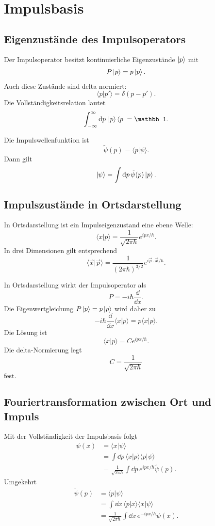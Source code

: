 \section{Impulsbasis}

\subsection{Eigenzustände des Impulsoperators}

Der Impulsoperator besitzt kontinuierliche Eigenzustände $\left|p\right\rangle$ mit
\[
    P\left|p\right\rangle=p\left|p\right\rangle.
\]
Auch diese Zustände sind delta-normiert:
\[
    \langle p|p'\rangle=\delta(p-p').
\]
Die Vollständigkeitsrelation lautet
\[
    \int_{-\infty}^{\infty}\dd p\,\ket p\bra p=\mathbb 1.
\]

Die Impulswellenfunktion ist
\[
    \tilde\psi(p)=\langle p|\psi\rangle.
\]
Dann gilt
\[
    \left|\psi\right\rangle=\int\mathrm{d} p\,\tilde\psi(p)\left|p\right\rangle.
\]

\subsection{Impulszustände in Ortsdarstellung}

In Ortsdarstellung ist ein Impulseigenzustand eine ebene Welle:
\[
    \langle x|p\rangle=\frac{1}{\sqrt{2\pi\hbar}}e^{ipx/\hbar}.
\]
In drei Dimensionen gilt entsprechend
\[
    \langle \vec x|\vec p\rangle
    =\frac{1}{(2\pi\hbar)^{3/2}}e^{i\vec p\cdot\vec x/\hbar}.
\]

\begin{derivationbox}
In Ortsdarstellung wirkt der Impulsoperator als
\[
    P=-i\hbar\frac{\dd}{\dd x}.
\]
Die Eigenwertgleichung $P\left|p\right\rangle=p\left|p\right\rangle$ wird daher zu
\[
    -i\hbar\frac{\dd}{\dd x}\langle x|p\rangle
    =p\langle x|p\rangle.
\]
Die Lösung ist
\[
    \langle x|p\rangle=C e^{ipx/\hbar}.
\]
Die delta-Normierung legt
\[
    C=\frac{1}{\sqrt{2\pi\hbar}}
\]
fest.
\end{derivationbox}

\subsection{Fouriertransformation zwischen Ort und Impuls}

Mit der Vollständigkeit der Impulsbasis folgt
\[
\begin{aligned}
    \psi(x)
    &=\langle x|\psi\rangle \\
    &=\int\dd p\,\langle x|p\rangle\langle p|\psi\rangle \\
    &=\frac{1}{\sqrt{2\pi\hbar}}
      \int\dd p\,e^{ipx/\hbar}\tilde\psi(p).
\end{aligned}
\]
Umgekehrt
\[
\begin{aligned}
    \tilde\psi(p)
    &=\langle p|\psi\rangle \\
    &=\int\dd x\,\langle p|x\rangle\langle x|\psi\rangle \\
    &=\frac{1}{\sqrt{2\pi\hbar}}
      \int\dd x\,e^{-ipx/\hbar}\psi(x).
\end{aligned}
\]

